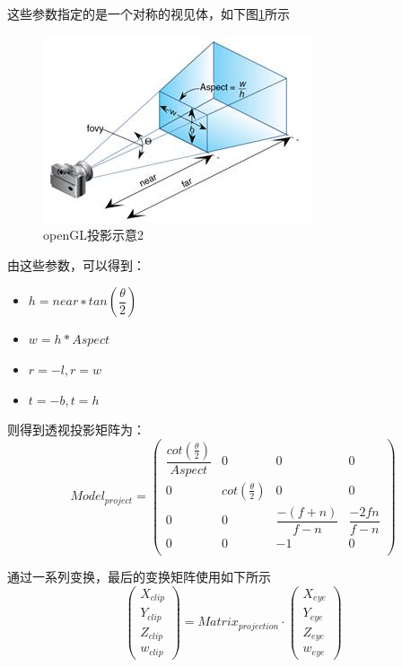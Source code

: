 \documentclass[UTF8,a4paper,12pt]{ctexbook}
\begin{document}
			这些参数指定的是一个对称的视见体，如下图\ref{ts2}所示
				\begin{figure}[htbp]
					\centering
					\includegraphics[scale = 1]{toushi2.png}
					\caption{openGL投影示意2}
					\label{ts2}
				\end{figure}
		
			由这些参数，可以得到： 
				\begin{itemize}[itemindent = 1em]
					\item $h=near∗tan(\dfrac{\theta}{2})$
					\item $w=h*Aspect$
					\item $r=−l,r=w$
					\item $t=−b,t=h$
				\end{itemize}
				
			则得到透视投影矩阵为：
				$$
				Model_{project} =  
				\left(
				\begin{array}{cccc}
				\dfrac{cot(\frac{\theta}{2})}{Aspect} & 0 & 0& 0\\
				
				0 & cot(\frac{\theta}{2}) & 0& 0\\
				
				0 & 0 & \dfrac{-(f+n)}{f-n}& \dfrac{-2fn}{f-n}\\
				
				0 & 0 & -1& 0\\
				\end{array}
				\right)
				$$
				
			通过一系列变换，最后的变换矩阵使用如下所示	
				$$ 	
				\left(
				\begin{array}{c}
					X_{clip}\\ 
					Y_{clip}\\
					Z_{clip}\\
					w_{clip}
				\end{array}	
				\right) 
				=
				Matrix_{projection}
				\cdot
				\left(
				\begin{array}{c}
				X_{eye}\\ 
				Y_{eye}\\
				Z_{eye}\\
				w_{eye}
				\end{array}	
				\right) 
				$$	
			
\end{document}
